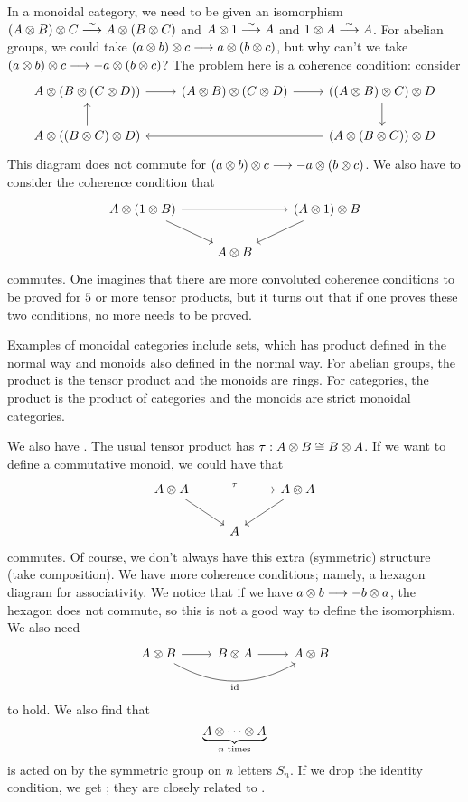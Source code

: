 \documentclass[11pt, oneside]{article}
\begin{document}
In a monoidal category, we need to be given an isomorphism $(A\otimes B)\otimes C \overset {\sim} {\longrightarrow} A\otimes(B\otimes C)$ and $A \otimes 1 \overset {\sim} {\longrightarrow} A $ and $1\otimes A\overset {\sim} {\longrightarrow} A$. For abelian groups, we could take $(a\otimes b)\otimes c \longrightarrow a\otimes (b\otimes c)$, but why can't we take $(a\otimes b)\otimes c \longrightarrow -a\otimes (b\otimes c)$? The problem here is a coherence condition: consider 
 \[
\begin{tikzcd}
A \tensor (B \tensor (C \tensor D)) \arrow[r]  & (A \tensor B)\tensor (C \tensor D) \arrow[r] & ((A\tensor B)\tensor C)\tensor D\arrow [d] \\
A\tensor ((B\tensor C)\tensor D) \arrow[u]&& (A\tensor (B\tensor C))\tensor D \arrow[ll]
\end{tikzcd}
\]
This diagram does not commute for $(a\otimes b)\otimes c \longrightarrow -a\otimes (b\otimes c)$. We also have to consider the coherence condition that
 \[
\begin{tikzcd}
A\tensor (1 \tensor B) \arrow[rr]  \arrow [rd]&& (A\tensor 1) \tensor B \arrow[ld]\\
& A\tensor B
\end{tikzcd}
\]
commutes. One imagines that there are more convoluted coherence conditions to be proved for $5$ or more tensor products, but it turns out that if one proves these two conditions, no more needs to be proved. %

Examples of monoidal categories include sets, which has product defined in the normal way and monoids also defined in the normal way. For abelian groups, the product is the tensor product and the monoids are rings. For categories, the product is the product of categories and the monoids are strict monoidal categories.

We also have \href{https://en.wikipedia.org/wiki/Symmetric_monoidal_category}{}. The usual tensor product has $\tau:A\otimes B \cong B \otimes A$. If we want to define a commutative monoid, we could have that
 \[
\begin{tikzcd}
A\tensor A \arrow[rr, "\tau"]  \arrow [rd]&& A\tensor A \arrow[ld]\\
& A
\end{tikzcd}
\]
commutes. Of course, we don't always have this extra (symmetric) structure (take composition). We have more coherence conditions; namely, a hexagon diagram for associativity. We notice that if we have $a\otimes b\longrightarrow -b\otimes a$, the hexagon does not commute, so this is not a good way to define the isomorphism. We also need
 \[
\begin{tikzcd}
A \tensor B \arrow[r] \arrow[rr, bend right, "\mathrm{id}",swap] & B \tensor A\arrow [r] &A\tensor B
\end{tikzcd}
\]
to hold. We also find that
$$
\underbrace{A \otimes \cdots \otimes A }_{n \textrm{ times}}
$$
is acted on by the symmetric group on $n$ letters $S_n$. If we drop the identity condition, we get \href{https://en.wikipedia.org/wiki/Braided_monoidal_category}{}; they are closely related to \href{https://en.wikipedia.org/wiki/Braid_group}{}.
\end{document}
